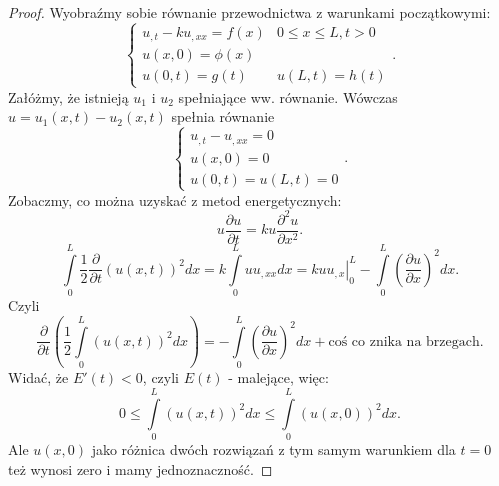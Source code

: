 \documentclass[../main.tex]{subfiles}
\begin{document}
\begin{proof}
Wyobraźmy sobie równanie przewodnictwa z warunkami początkowymi:
\[
\begin{cases}
		u_{,t} - ku_{,x x} = f(x)&0 \le x \le L, t>0\\
		u(x,0) = \phi(x)\\
		u(0,t) = g(t)& u(L,t) = h(t)
\end{cases}
.\]
Załóżmy, że istnieją $u_1$ i $u_2$ spełniające ww. równanie. Wówczas $u = u_1(x,t) - u_2(x,t)$ spełnia równanie
\[
\begin{cases}
		u_{,t} - u_{,x x} = 0\\
		u(x,0) = 0\\
		u(0,t) = u(L,t) = 0
\end{cases}
.\]
Zobaczmy, co można uzyskać z metod energetycznych:
\[
u\frac{\partial u}{\partial t} = k u \frac{\partial ^2 u}{\partial x^2}
.\]
\[
		\int\limits_0^L \frac{1}{2}\frac{\partial }{\partial t} (u(x,t))^2 dx = k \int\limits_0^L u u_{,x x}dx = \left.k u u_{,x}\right|_0^L - \int\limits_0^L \left( \frac{\partial u}{\partial x}  \right) ^2 dx
.\]
Czyli
\[
		\frac{\partial }{\partial t} \left( \frac{1}{2}\int\limits_0^L \left( u(x,t) \right) ^2 dx \right) = - \int\limits_0^L \left( \frac{\partial u}{\partial x}  \right) ^2 dx + \text{coś co znika na brzegach}
.\]
Widać, że $E'(t) < 0$, czyli $E(t)$ - malejące, więc:
\[
		0 \le \int\limits_0^L \left( u(x,t) \right) ^2 dx \le \int\limits_0^L \left( u(x,0) \right) ^2 dx
.\]
Ale $u(x,0)$ jako różnica dwóch rozwiązań z tym samym warunkiem dla $t=0$ też wynosi zero i mamy jednoznaczność.
\end{proof}
\end{document}
